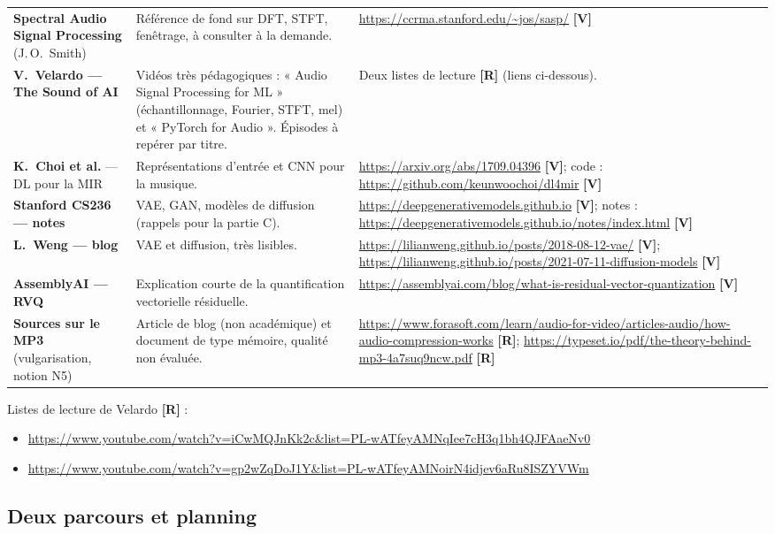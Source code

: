 \documentclass[11pt,a4paper]{article}
\newcommand{\sV}{\textbf{[V]}}
\newcommand{\sR}{\textbf{[R]}}
\begin{document}
{\begin{longtable}{L{3.2cm}L{6.2cm}L{4.5cm}}
\textbf{Spectral Audio Signal Processing} (J.\,O.~Smith) & Référence de fond sur DFT, STFT, fenêtrage, à consulter à la demande. & \url{https://ccrma.stanford.edu/~jos/sasp/} \sV\\
\textbf{V.~Velardo --- The Sound of AI} & Vidéos très pédagogiques : « Audio Signal Processing for ML » (échantillonnage, Fourier, STFT, mel) et « PyTorch for Audio ». Épisodes à repérer par titre. & Deux listes de lecture \sR{} (liens ci-dessous).\\
\textbf{K.~Choi et al.} --- DL pour la MIR & Représentations d'entrée et CNN pour la musique. & \url{https://arxiv.org/abs/1709.04396} \sV ; code : \url{https://github.com/keunwoochoi/dl4mir} \sV\\
\textbf{Stanford CS236 --- notes} & VAE, GAN, modèles de diffusion (rappels pour la partie C). & \url{https://deepgenerativemodels.github.io} \sV ; notes : \url{https://deepgenerativemodels.github.io/notes/index.html} \sV\\
\textbf{L.~Weng --- blog} & VAE et diffusion, très lisibles. & \url{https://lilianweng.github.io/posts/2018-08-12-vae/} \sV ; \url{https://lilianweng.github.io/posts/2021-07-11-diffusion-models} \sV\\
\textbf{AssemblyAI --- RVQ} & Explication courte de la quantification vectorielle résiduelle. & \url{https://assemblyai.com/blog/what-is-residual-vector-quantization} \sV\\
\textbf{Sources sur le MP3} (vulgarisation, notion N5) & Article de blog (non académique) et document de type mémoire, qualité non évaluée. & \url{https://www.forasoft.com/learn/audio-for-video/articles-audio/how-audio-compression-works} \sR ; \url{https://typeset.io/pdf/the-theory-behind-mp3-4a7suq9ncw.pdf} \sR\\
\end{longtable}
}

Listes de lecture de Velardo \sR{} :
\begin{itemize}
  \item \url{https://www.youtube.com/watch?v=iCwMQJnKk2c&list=PL-wATfeyAMNqIee7cH3q1bh4QJFAaeNv0}
  \item \url{https://www.youtube.com/watch?v=gp2wZqDoJ1Y&list=PL-wATfeyAMNoirN4idjev6aRu8ISZYVWm}
\end{itemize}

\subsection{Deux parcours et planning}
\end{document}
